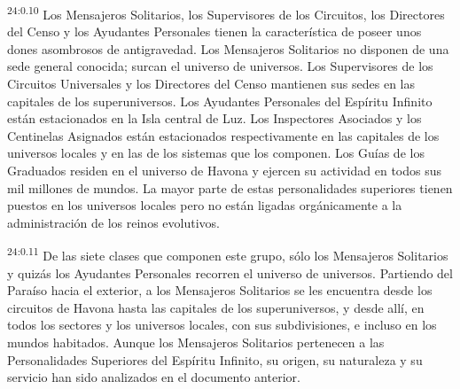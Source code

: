 \par
\textsuperscript{24:0.10} Los Mensajeros Solitarios, los Supervisores de los Circuitos, los Directores del Censo y los Ayudantes Personales tienen la característica de poseer unos dones asombrosos de antigravedad. Los Mensajeros Solitarios no disponen de una sede general conocida; surcan el universo de universos. Los Supervisores de los Circuitos Universales y los Directores del Censo mantienen sus sedes en las capitales de los superuniversos. Los Ayudantes Personales del Espíritu Infinito están estacionados en la Isla central de Luz. Los Inspectores Asociados y los Centinelas Asignados están estacionados respectivamente en las capitales de los universos locales y en las de los sistemas que los componen. Los Guías de los Graduados residen en el universo de Havona y ejercen su actividad en todos sus mil millones de mundos. La mayor parte de estas personalidades superiores tienen puestos en los universos locales pero no están ligadas orgánicamente a la administración de los reinos evolutivos.

\par
\textsuperscript{24:0.11} De las siete clases que componen este grupo, sólo los Mensajeros Solitarios y quizás los Ayudantes Personales recorren el universo de universos. Partiendo del Paraíso hacia el exterior, a los Mensajeros Solitarios se les encuentra desde los circuitos de Havona hasta las capitales de los superuniversos, y desde allí, en todos los sectores y los universos locales, con sus subdivisiones, e incluso en los mundos habitados. Aunque los Mensajeros Solitarios pertenecen a las Personalidades Superiores del Espíritu Infinito, su origen, su naturaleza y su servicio han sido analizados en el documento anterior.

